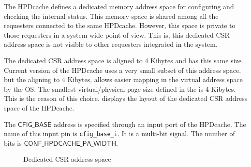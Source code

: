 \documentclass[10pt,titlepage,twoside]{book}
\begin{document}
The \ac{HPDcache} defines a dedicated memory address space for configuring and checking the internal status.
This memory space is shared among all the requesters connected to the same \ac{HPDcache}.
However, this space is private to those requesters in a system-wide point of view.
This is, this dedicated \ac{CSR} address space is not visible to other requesters integrated in the system.

The dedicated \ac{CSR} address space is aligned to 4 Kibytes and has this same size.
Current version of the \ac{HPDcache} uses a very small subset of this address space, but the aligning to 4 Kibytes, allows easier mapping in the virtual address space by the \ac{OS}.
The smallest virtual/physical page size defined in the \cite{RISCV_privileged_spec} is 4 Kibytes.
This is the reason of this choice.
 displays the layout of the dedicated \ac{CSR} address space of the \ac{HPDcache}.

The $\mathsf{CFIG\_BASE}$ address is specified through an input port of the \ac{HPDcache}.
The name of this input pin is \lstinline{cfig_base_i}.
It is a multi-bit signal.
The number of bits is $\mathsf{CONF\_HPDCACHE\_PA\_WIDTH}$.

\begin{figure}[!htbp]
\begin{center}
  \caption{Dedicated CSR address space}%
\end{center}
\end{figure}
\end{document}
